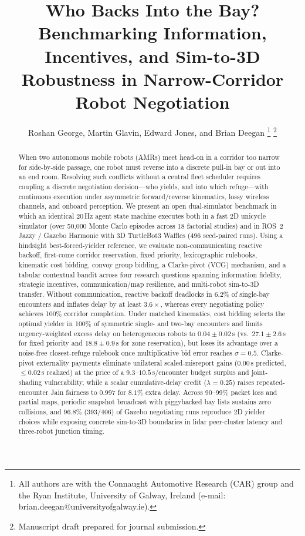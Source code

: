 \documentclass[letterpaper,journal]{IEEEtran}
\begin{document}

\title{Who Backs Into the Bay? Benchmarking Information, Incentives, and Sim-to-3D Robustness in Narrow-Corridor Robot Negotiation}

\author{Roshan George, Martin Glavin, Edward Jones, and Brian Deegan%
\thanks{All authors are with the Connaught Automotive Research (CAR) group and the Ryan Institute, University of Galway, Ireland (e-mail: brian.deegan@universityofgalway.ie).}%
\thanks{Manuscript draft prepared for journal submission.}}

\maketitle

\begin{abstract}
When two autonomous mobile robots (AMRs) meet head-on in a corridor too narrow for side-by-side passage, one robot must reverse into a discrete pull-in bay or out into an end room. Resolving such conflicts without a central fleet scheduler requires coupling a discrete negotiation decision---who yields, and into which refuge---with continuous execution under asymmetric forward/reverse kinematics, lossy wireless channels, and onboard perception. We present an open dual-simulator benchmark in which an identical 20\,Hz agent state machine executes both in a fast 2D unicycle simulator (over 50,000 Monte Carlo episodes across 18 factorial studies) and in ROS~2 Jazzy / Gazebo Harmonic with 3D TurtleBot3 Waffles (496 seed-paired runs). Using a hindsight best-forced-yielder reference, we evaluate non-communicating reactive backoff, first-come corridor reservation, fixed priority, lexicographic rulebooks, kinematic cost bidding, convoy group bidding, a Clarke-pivot (VCG) mechanism, and a tabular contextual bandit across four research questions spanning information fidelity, strategic incentives, communication/map resilience, and multi-robot sim-to-3D transfer. Without communication, reactive backoff deadlocks in 6.2\% of single-bay encounters and inflates delay by at least $3.6\times$, whereas every negotiating policy achieves 100\% corridor completion. Under matched kinematics, cost bidding selects the optimal yielder in 100\% of symmetric single- and two-bay encounters and limits urgency-weighted excess delay on heterogeneous robots to $0.04\pm0.02$\,s (vs.\ $27.1\pm2.6$\,s for fixed priority and $18.8\pm0.9$\,s for zone reservation), but loses its advantage over a noise-free closest-refuge rulebook once multiplicative bid error reaches $\sigma=0.5$. Clarke-pivot externality payments eliminate unilateral scaled-misreport gains ($0.00$\,s predicted, $\le 0.02$\,s realized) at the price of a $9.3$--$10.5$\,s/encounter budget surplus and joint-shading vulnerability, while a scalar cumulative-delay credit ($\lambda=0.25$) raises repeated-encounter Jain fairness to $0.997$ for $8.1\%$ extra delay. Across 90--99\% packet loss and partial maps, periodic snapshot broadcast with piggybacked bay lists sustains zero collisions, and 96.8\% (393/406) of Gazebo negotiating runs reproduce 2D yielder choices while exposing concrete sim-to-3D boundaries in lidar peer-cluster latency and three-robot junction timing.
\end{abstract}
\end{document}
